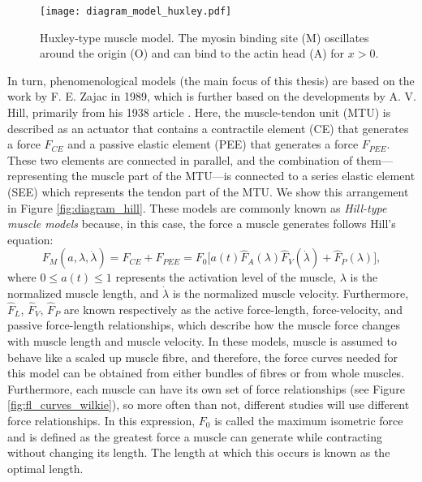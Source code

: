 \documentclass{sfuthesis}
\numberwithin{equation}{section}
\numberwithin{figure}{chapter}
\numberwithin{table}{chapter}
\theoremstyle{definition}
\begin{document}
\begin{figure}
    \centering
    \texttt{[image: diagram\_model\_huxley.pdf]}
    \caption{Huxley-type muscle model. The myosin binding site (M) oscillates around the origin (O) and can bind to the actin head (A) for $x>0$.\label{fig:diagram_huxley}}
\end{figure}

In turn, phenomenological models (the main focus of this thesis) are based on the work by F. E. Zajac \cite{Zajac1989} in 1989, which is further based on the developments by A. V. Hill, primarily from his 1938 article \cite{Hill1938}. Here, the muscle-tendon unit (MTU) is described as an actuator that contains a contractile element (CE) that generates a force $F_{CE}$ and a passive elastic element (PEE) that generates a force $F_{PEE}$. These two elements are connected in parallel, and the combination of them---representing the muscle part of the MTU---is connected to a series elastic element (SEE) which represents the tendon part of the MTU. We show this arrangement in Figure \ref{fig:diagram_hill}. These models are commonly known as \textit{Hill-type muscle models} because, in this case, the force a muscle generates follows Hill's equation:
\begin{equation} \label{eq:hill_in_intro}
    F_M(a,\lambda,\dot{\lambda}) = F_{CE} + F_{PEE} = F_0  \Big[ a(t) \widehat{F}_A(\lambda) \widehat{F}_V(\dot{\lambda}) + \widehat{F}_P(\lambda) \Big], 
\end{equation}
where $0 \leq a(t) \leq 1$ represents the activation level of the muscle, $\lambda$ is the normalized muscle length, and $\dot{\lambda}$ is the normalized muscle velocity. Furthermore, $\widehat{F}_L$, $\widehat{F}_V$, $\widehat{F}_P$ are known respectively as the active force-length, force-velocity, and passive force-length relationships, which describe how the muscle force changes with muscle length and muscle velocity. In these models, muscle is assumed to behave like a scaled up muscle fibre, and therefore, the force curves needed for this model can be obtained from either bundles of fibres or from whole muscles. Furthermore, each muscle can have its own set of force relationships (see Figure \ref{fig:fl_curves_wilkie}), so more often than not, different studies will use different force relationships. 
In this expression, $F_0$ is called the maximum isometric force and is defined as the greatest force a muscle can generate while contracting without changing its length. The length at which this occurs is known as the optimal length.
\end{document}
